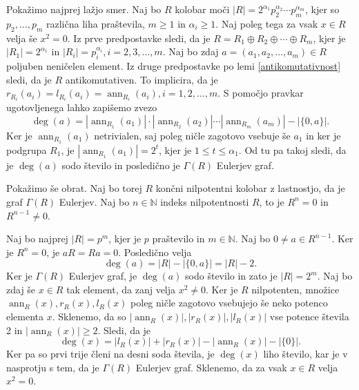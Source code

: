 \documentclass[a4paper, 12pt]{amsart}
\theoremstyle{definition} %
\theoremstyle{plain} %
\newcommand{\N}{\mathbb N}
\DeclareMathOperator{\ann}{ann}
\begin{document}
\proof
Pokažimo najprej lažjo smer. Naj bo $R$ kolobar moči $|R| = 2^{\alpha_1} p_2^{\alpha_2} \cdots  p_m^{\alpha_m}$, kjer so $p_2, \dots, p_m$ različna liha praštevila, $m\ge 1$ in $\alpha_i \ge 1$. Naj poleg tega za vsak $x\in R$ velja še $x^2 = 0$. Iz prve predpostavke sledi, da je $R = R_1 \oplus R_2 \oplus \cdots \oplus R_m$, kjer je $|R_1| = 2^{\alpha_1}$ in $|R_i| = p_i ^{\alpha_i}, i = 2,3,\dots,m$. Naj bo zdaj $a=(a_1,a_2,\dots,a_m)\in R$ poljuben neničelen element. Iz druge predpostavke po lemi \ref{antikomutativnost} sledi, da je $R$ antikomutativen. To implicira, da je $r_{R_i}(a_i) =l_{R_i}(a_i) = \ann_{R_i}(a_i), i=1,2,\dots,m$. S pomočjo pravkar ugotovljenega lahko zapišemo zvezo
$$
\deg(a) = |\ann_{R_1}(a_1)|\cdot|\ann_{R_2}(a_2)|\cdots|\ann_{R_m}(a_m)| - |\{0,a\}|.
$$
Ker je $\ann_{R_1}(a_1)$ netrivialen, saj poleg ničle zagotovo vsebuje še $a_1$ in ker je podgrupa $R_1$, je $|\ann_{R_1}(a_1)| = 2^{t}$, kjer je $1 \le t \le \alpha_1$. Od tu pa takoj sledi, da je $\deg(a)$ sodo število in posledično je $\Gamma(R)$ Eulerjev graf.

Pokažimo še obrat. Naj bo torej $R$ končni nilpotentni kolobar z lastnostjo, da je graf $\Gamma(R)$ Eulerjev. Naj bo $n\in \N$ indeks nilpotentnosti $R$, to je $R^n = 0$ in $R^{n-1}\neq 0$. 

Naj bo najprej $|R| = p^m$, kjer je $p$ praštevilo in $m\in \N$. Naj bo $0\neq a \in R^{n-1}$. Ker je $R^n = 0$, je $aR = Ra = 0$. Posledično velja 
$$
\deg(a)  = |R| -|\{0,a\}| = |R| - 2.
$$
Ker je $\Gamma(R)$ Eulerjev graf, je $\deg(a)$ sodo število in zato je $|R| = 2^m$. Naj bo zdaj še $x\in R$ tak element, da zanj velja $x^2 \neq 0$. Ker je $R$ nilpotenten, množice $\ann_R(x), r_R(x),l_R(x) $ poleg ničle zagotovo vsebujejo še neko potenco elementa $x$. Sklenemo, da so $| \ann_R(x)|, |r_R(x)|, |l_R(x)| $ vse potence števila 2 in $|\ann_R(x) | \ge 2$. Sledi, da je 
$$
\deg(x) = |l_R(x) | + |r_R(x)| - |\ann_R(x)| - |\{0\}|.
$$
Ker pa so prvi trije členi na desni soda števila, je $\deg(x)$ liho število, kar je v nasprotju s tem, da je $\Gamma(R)$ Eulerjev graf. Sklenemo, da za vsak $x\in R $ velja $x^2=0$.
\end{document}
